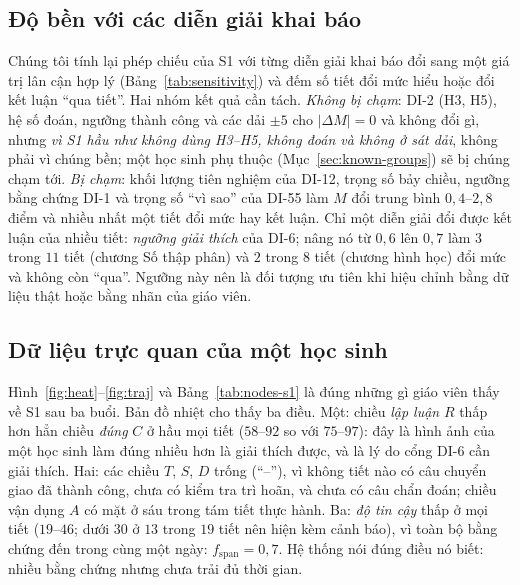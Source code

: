 \subsection{Độ bền với các diễn giải khai báo}\label{sec:sensitivity}
Chúng tôi tính lại phép chiếu của S1 với từng diễn giải khai báo đổi sang một giá trị lân cận hợp lý (Bảng~\ref{tab:sensitivity}) và đếm số tiết đổi mức hiểu hoặc đổi kết luận ``qua tiết''. Hai nhóm kết quả cần tách. \emph{Không bị chạm}: DI-2 (H3, H5), hệ số đoán, ngưỡng thành công và các dải $\pm5$ cho $|\Delta M|=0$ và không đổi gì, nhưng \emph{vì S1 hầu như không dùng H3--H5, không đoán và không ở sát dải}, không phải vì chúng bền; một học sinh phụ thuộc (Mục~\ref{sec:known-groups}) sẽ bị chúng chạm tới. \emph{Bị chạm}: khối lượng tiên nghiệm của DI-12, trọng số bảy chiều, ngưỡng bằng chứng DI-1 và trọng số ``vì sao'' của DI-55 làm $M$ đổi trung bình $0{,}4$--$2{,}8$ điểm và nhiều nhất một tiết đổi mức hay kết luận. Chỉ một diễn giải đổi được kết luận của nhiều tiết: \emph{ngưỡng giải thích} của DI-6; nâng nó từ $0{,}6$ lên $0{,}7$ làm $3$ trong $11$ tiết (chương Số thập phân) và $2$ trong $8$ tiết (chương hình học) đổi mức và không còn ``qua''. Ngưỡng này nên là đối tượng ưu tiên khi hiệu chỉnh bằng dữ liệu thật hoặc bằng nhãn của giáo viên.

\begin{table}[tp]
\centering
\caption{Độ nhạy của phép chiếu của S1 với từng diễn giải khai báo. $|\Delta M|$ TB: thay đổi tuyệt đối trung bình của $M$ trên các tiết; ``Đổi mức/qua'': số tiết đổi mức hiểu / đổi kết luận đã qua. $0$ trên cột là ``không bị chạm'', không phải ``bền''.}
\label{tab:sensitivity}

\end{table}

\subsection{Dữ liệu trực quan của một học sinh}\label{sec:visual}
Hình~\ref{fig:heat}--\ref{fig:traj} và Bảng~\ref{tab:nodes-s1} là đúng những gì giáo viên thấy về S1 sau ba buổi. Bản đồ nhiệt cho thấy ba điều. Một: chiều \emph{lập luận} $R$ thấp hơn hẳn chiều \emph{đúng} $C$ ở hầu mọi tiết ($58$--$92$ so với $75$--$97$): đây là hình ảnh của một học sinh làm đúng nhiều hơn là giải thích được, và là lý do cổng DI-6 cần giải thích. Hai: các chiều $T$, $S$, $D$ trống (``--''), vì không tiết nào có câu chuyển giao đã thành công, chưa có kiểm tra trì hoãn, và chưa có câu chẩn đoán; chiều vận dụng $A$ có mặt ở sáu trong tám tiết thực hành. Ba: \emph{độ tin cậy} thấp ở mọi tiết ($19$--$46$; dưới $30$ ở $13$ trong $19$ tiết nên hiện kèm cảnh báo), vì toàn bộ bằng chứng đến trong cùng một ngày: $f_{\text{span}}=0{,}7$. Hệ thống nói đúng điều nó biết: nhiều bằng chứng nhưng chưa trải đủ thời gian.


